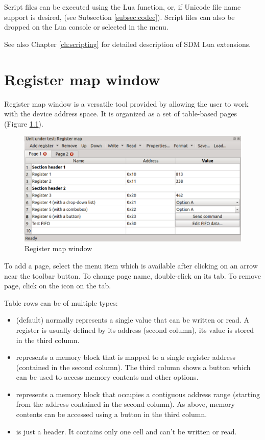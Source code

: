\documentclass[a4paper,12pt,twoside,extrafontsizes]{memoir}
\begin{document}
Script files can be executed using the  Lua function, or, if Unicode file name support is desired,  (see Subsection \ref{subsec:codec}). Script files can also be dropped on the Lua console or selected in the  menu.

See also Chapter \ref{ch:scripting} for detailed description of SDM Lua extensions.

\chapter{Register map window}
\label{ch:registermap}

Register map window is a versatile tool provided by  allowing the user to work with the device address space. It is organized as a set of table-based pages (Figure \ref{fig:registermap}).

\begin{figure}[htbp]
\centering
\includegraphics[scale=0.75]{images/registermap.png}
\caption{Register map window}
\label{fig:registermap}
\end{figure}

To add a page, select the  menu item which is available after clicking on an arrow near the  toolbar button. To change page name, double-click on its tab. To remove page, click on the  icon on the tab.

Table rows can be of multiple types:

\begin{itemize}
	\item {} (default) normally represents a single value that can be written or read. A register is usually defined by its address (second column), its value is stored in the third column.
	\item {} represents a memory block that is mapped to a single register address (contained in the second column). The third column shows a button which can be used to access memory contents and other options.
	\item {} represents a memory block that occupies a contiguous address range (starting from the address contained in the second column). As above, memory contents can be accessed using a button in the third column.
	\item {} is just a header. It contains only one cell and can't be written or read.
\end{itemize}
\end{document}
